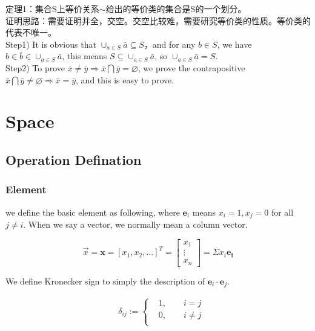 定理1：集合S上等价关系$\sim$给出的等价类的集合是S的一个划分。\\
证明思路：需要证明并全，交空。交空比较难，需要研究等价类的性质。等价类的代表不唯一。\\
Step1)  It is obvious that $\cup _{a \in S} {\bar a} \subseteq S$，and for any $b \in S$, we have $b \in \bar b \in \cup _{a \in S} {\bar a}$, this means $S \subseteq \cup _{a \in S} {\bar a}  $, so $ \cup _{a \in S} {\bar a} =S $.\\
Step2) To prove $\bar x \neq \bar y \Rightarrow \bar x \bigcap \bar y = \varnothing  $, we prove the contrapositive $ \bar x \bigcap \bar y \neq \varnothing \Rightarrow  \bar x = \bar y$, and this is easy to prove.\\







\section{Space}

\subsection{Operation Defination}

\subsubsection{Element}

we define the basic element as following, where $ \boldsymbol e_i $ means $x_i = 1, x_j = 0$ for all $j \neq i$. When we say a vector, we normally mean a column vector.

\begin{equation}
\vec{x}  = \boldsymbol x = [x_1, x_2,\dots]^T
= \begin{bmatrix}
    x_1 \\
    \vdots \\
    x_n
\end{bmatrix}
= \Sigma x_i \boldsymbol{e_i} 
\end{equation}

We define Kronecker sign to simply the description of $\boldsymbol e_i \cdot \boldsymbol e_j $.

\begin{equation}
    \begin{split}
    &\delta _{ij}:=
    \begin{cases}
    &1,\qquad i = j\\
    &0,\qquad i \neq j\\
    \end{cases}\\
    \end{split}
\end{equation}


